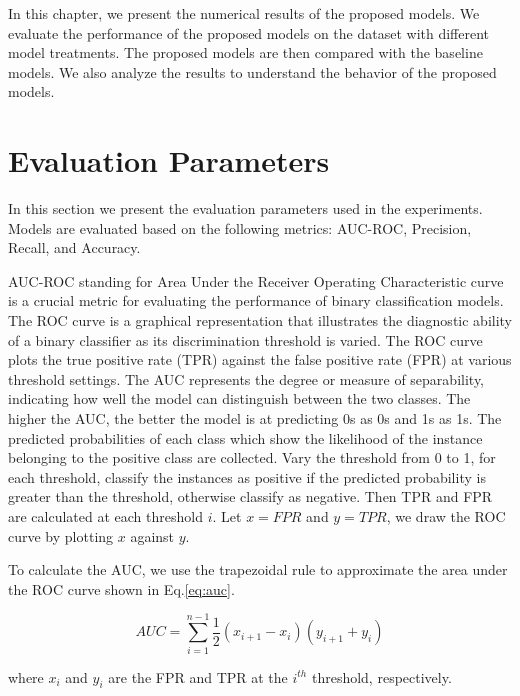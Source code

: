 \documentclass[../main.tex]{subfiles}
\begin{document}

In this chapter, we present the numerical results of the proposed models.
We evaluate the performance of the proposed models on the dataset with different model treatments.
The proposed models are then compared with the baseline models.
We also analyze the results to understand the behavior of the proposed models.


\section{Evaluation Parameters}


In this section we present the evaluation parameters used in the experiments.
Models are evaluated based on the following metrics:
AUC-ROC, Precision, Recall, and Accuracy.


AUC-ROC standing for Area Under the Receiver Operating Characteristic curve is a crucial metric for evaluating the performance of binary classification models.
The ROC curve is a graphical representation that illustrates the diagnostic ability of a binary classifier as its discrimination threshold is varied.
The ROC curve plots the true positive rate (TPR) against the false positive rate (FPR) at various threshold settings.
The AUC represents the degree or measure of separability, indicating how well the model can distinguish between the two classes.
The higher the AUC, the better the model is at predicting 0s as 0s and 1s as 1s.
The predicted probabilities of each class which show the likelihood of the instance belonging to the positive class are collected.
Vary the threshold from 0 to 1, for each threshold, classify the instances as positive if the predicted probability is greater than the threshold, otherwise classify as negative.
Then TPR and FPR are calculated at each threshold $i$.
Let $x = FPR$ and $y = TPR$, we draw the ROC curve by plotting $x$ against $y$.

To calculate the AUC, we use the trapezoidal rule to approximate the area under the ROC curve shown in Eq.\ref{eq:auc}.

\begin{equation}
    \label{eq:auc}
    AUC = \sum_{i=1}^{n-1} \frac{1}{2} (x_{i+1} - x_{i}) (y_{i+1} + y_{i})
\end{equation}

where $x_i$ and $y_i$ are the FPR and TPR at the $i^{th}$ threshold, respectively.
\end{document}
